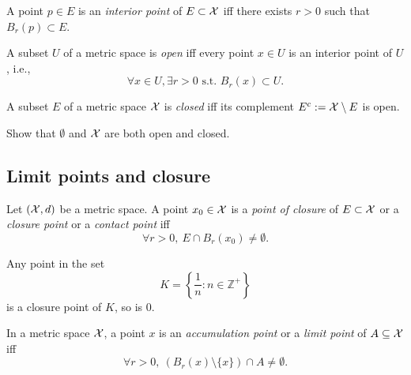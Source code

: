 \begin{defn}
  \label{def:interiorPoint}
  A point $p\in E$ is an \emph{interior point} of $E\subset {\cal X}$
  iff there exists $r>0$ such that $B_r(p)\subset E$.
\end{defn}

\begin{defn}
  \label{def:openSetInMetricSpace}
  A subset $U$ of a metric space is \emph{open} iff
  every point $x\in U$ is an interior point of $U$, i.e., 
  \begin{displaymath}
    \forall x\in U, \exists r>0 \text{ s.t. }
    B_r(x)\subset U.
  \end{displaymath}
\end{defn}

\begin{defn}
  \label{def:closedSets}
  A subset $E$ of a metric space ${\cal X}$ is \emph{closed}
  iff its complement $E^c:={\cal X}\setminus E$ is open.
\end{defn}

\begin{exc}
  Show that $\emptyset$ and ${\cal X}$
  are both open and closed.
\end{exc}


\subsection{Limit points and closure}
\label{sec:limit-points-conv}

\begin{defn}
  \label{def:closurePointInMetricSpace}
  Let $({\cal X},d)$ be a metric space.
  A point $x_0\in {\cal X}$ is %
  a \emph{point of closure} of $E\subset {\cal X}$
  or a \emph{closure point} or a \emph{contact point}
  iff
  \begin{equation}
    \label{eq:closurePoint}
    \forall r>0, \ E\cap B_r(x_0) \ne \emptyset.
  \end{equation}
\end{defn}

\begin{exm}
  Any point in the set
   \begin{equation}
     \label{eq:K-Set}
     K=\left\{\frac{1}{n}: n\in \mathbb{Z}^+\right\}
   \end{equation}
   is a closure point of $K$,
   so is 0.
\end{exm}

\begin{defn}
  \label{def:limitPointMetricSpace}
  In a metric space ${\cal X}$, a point $x$ 
   is an \emph{accumulation point}
   or a \emph{limit point} of $A\subseteq {\cal X}$ iff
  \begin{equation}
    \label{eq:accumulationPointMetricSpace}
    \forall r>0,\ \left(B_r(x)\setminus\{x\}\right)\cap A
    \ne \emptyset. 
  \end{equation}
\end{defn}


